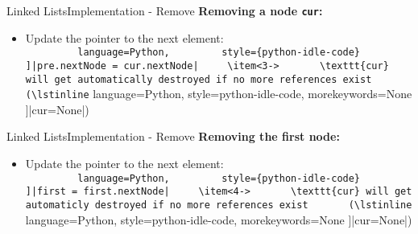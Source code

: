
\begin{frame}{Linked Lists}{Implementation - Remove}
  \textbf{Removing a node \texttt{cur}:}
  \begin{itemize}
    \item<2->
      Update the pointer to the next element:\\
      \lstinline[
        language=Python,
        style={python-idle-code}
      ]|pre.nextNode = cur.nextNode|
    \item<3->
      \texttt{cur} will get automatically destroyed if no more references exist
      (\lstinline[
        language=Python,
        style={python-idle-code},
        morekeywords={None}
      ]|cur=None|)
  \end{itemize}
  \begin{flushleft}
    
  \end{flushleft}
\end{frame}




\begin{frame}{Linked Lists}{Implementation - Remove}
  \textbf{Removing the first node:}
  \vspace{-1.0em}
  \begin{flushright}
    
  \end{flushright}
  \begin{itemize}
    \item<3->
      Update the pointer to the next element:\\
      \lstinline[
        language=Python,
        style={python-idle-code}
      ]|first = first.nextNode|
    \item<4->
      \texttt{cur} will get automaticly destroyed if no more references exist
      (\lstinline[
        language=Python,
        style={python-idle-code},
        morekeywords={None}
      ]|cur=None|)
  \end{itemize}
  \begin{flushright}
    
  \end{flushright}
\end{frame}

